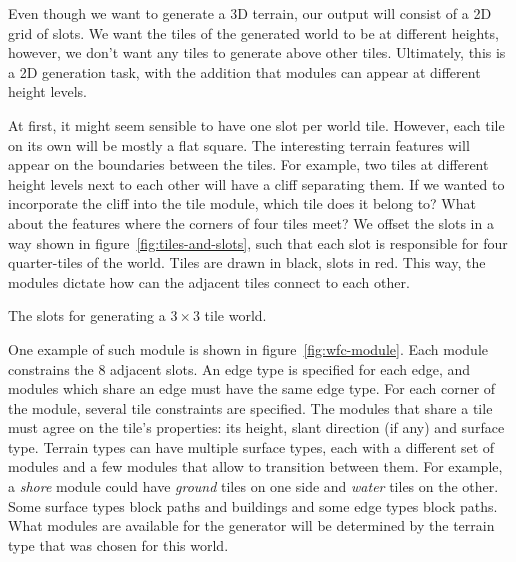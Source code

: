 Even though we want to generate a 3D terrain, our output will consist of a 2D grid of slots.
We want the tiles of the generated world to be at different heights, however, we don't want any tiles to generate above other tiles.
Ultimately, this is a 2D generation task, with the addition that modules can appear at different height levels.

At first, it might seem sensible to have one slot per world tile.
However, each tile on its own will be mostly a flat square.
The interesting terrain features will appear on the boundaries between the tiles.
For example, two tiles at different height levels next to each other will have a cliff separating them.
If we wanted to incorporate the cliff into the tile module, which tile does it belong to?
What about the features where the corners of four tiles meet?
We offset the slots in a way shown in figure~\ref{fig:tiles-and-slots}, such that each slot is responsible for four quarter-tiles of the world.
Tiles are drawn in black, slots in red.
This way, the modules dictate how can the adjacent tiles connect to each other.

\begin{center}
    \captionsetup{type=figure}
    \caption{The slots for generating a $3\times3$ tile world.}
    \label{fig:tiles-and-slots}
\end{center}

One example of such module is shown in figure~\ref{fig:wfc-module}.
Each module constrains the 8 adjacent slots.
An edge type is specified for each edge, and modules which share an edge must have the same edge type.
For each corner of the module, several tile constraints are specified.
The modules that share a tile must agree on the tile's properties: its height, slant direction (if any) and surface type.
Terrain types can have multiple surface types, each with a different set of modules and a few modules that allow to transition between them.
For example, a \emph{shore} module could have \emph{ground} tiles on one side and \emph{water} tiles on the other.
Some surface types block paths and buildings and some edge types block paths.
What modules are available for the generator will be determined by the terrain type that was chosen for this world.

